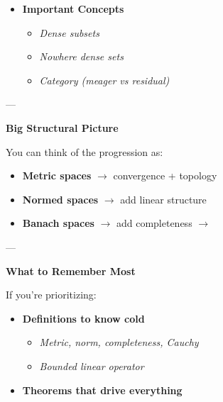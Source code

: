 \documentclass[12pt,a4paper]{report}
\begin{document}
\begin{description}
\begin{itemize}
\begin{itemize}
  * Complete metric spaces are ``large"
  * Foundation of many major results

            \end{itemize}
---

    \item \textbf{Important Concepts}

            \begin{itemize}
            \item \textit{Dense subsets}
            \item \textit{Nowhere dense sets}
            \item \textit{Category (meager vs residual)}
            \end{itemize}

    \end{itemize}
---

\item \textbf{Big Structural Picture}

You can think of the progression as:

        \begin{itemize}
        \item \textbf{Metric spaces} $\to$ convergence + topology

        \item \textbf{Normed spaces} $\to$ add linear structure

        \item \textbf{Banach spaces} $\to$ add completeness $\to$ 

        \end{itemize}
---

\item \textbf{What to Remember Most}

If you’re prioritizing:

    \begin{itemize}
        \item \textbf{Definitions to know cold}

            \begin{itemize}
            \item \textit{Metric, norm, completeness, Cauchy}
            \item \textit{Bounded linear operator}
            \end{itemize}

        \item \textbf{Theorems that drive everything}


\end{itemize}
\end{description}
\end{document}
